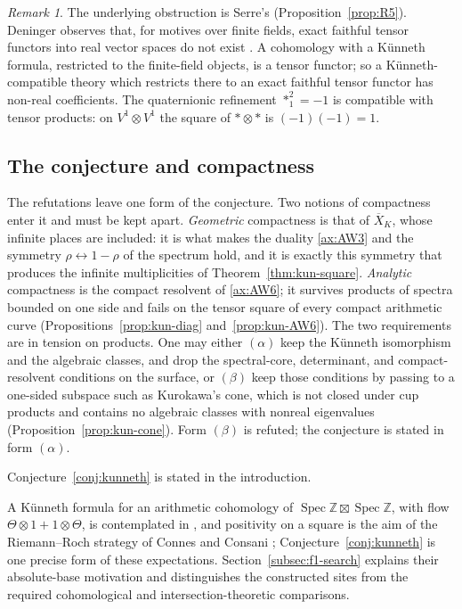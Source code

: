 \documentclass[11pt]{amsart}
\theoremstyle{plain}
\theoremstyle{definition}
\theoremstyle{remark}
\newtheorem{remark}[theorem]{Remark}
\numberwithin{equation}{section}
\newcommand{\Z}{\mathbb{Z}}
\newcommand{\Xbar}{\overline{X}}
\DeclareMathOperator{\Spec}{Spec}
\begin{document}
\begin{remark}\label{rem:kun-real}
The underlying obstruction is Serre's (Proposition~\ref{prop:R5}).
Deninger observes that, for motives over finite fields, exact faithful
tensor functors into real vector spaces do not exist
\cite[p.~184]{Deninger1998Analogies}. A cohomology with a K\"unneth
formula, restricted to the finite-field objects, is a tensor functor;
so a K\"unneth-compatible theory which restricts there to an exact
faithful tensor functor has non-real coefficients. The quaternionic
refinement $*_1^2=-1$ is compatible with tensor products: on
$V^1\otimes V^1$ the square of $*\otimes*$ is $(-1)(-1)=1$.
\end{remark}

\subsection{The conjecture and compactness}\label{subsec:kun-conj}

The refutations leave one form of the conjecture. Two notions of
compactness enter it and must be kept apart. \emph{Geometric}
compactness is that of $\Xbar_K$, whose infinite places are included:
it is what makes the duality \ref{ax:AW3} and the symmetry
$\rho\leftrightarrow1-\rho$ of the spectrum hold, and it is exactly this
symmetry that produces the infinite multiplicities of
Theorem~\ref{thm:kun-square}. \emph{Analytic} compactness is the compact
resolvent of \ref{ax:AW6}; it survives products of spectra bounded on
one side and fails on the tensor square of every compact arithmetic
curve (Propositions~\ref{prop:kun-diag} and~\ref{prop:kun-AW6}). The two
requirements are in tension on products. One may either $(\alpha)$ keep the
K\"unneth isomorphism and the algebraic classes, and drop the
spectral-core, determinant, and compact-resolvent conditions on the
surface, or $(\beta)$ keep those conditions by passing to a one-sided subspace
such as Kurokawa's cone, which is not closed under cup products and
contains no algebraic classes with nonreal eigenvalues
(Proposition~\ref{prop:kun-cone}). Form $(\beta)$ is refuted; the conjecture
is stated in form $(\alpha)$.

Conjecture~\ref{conj:kunneth} is stated in the introduction.


A K\"unneth formula for an arithmetic cohomology of
$\Spec\Z\boxtimes\Spec\Z$, with flow $\Theta\otimes1+1\otimes\Theta$,
is contemplated in \cite[(7.32), pp.~41--42]{Deninger1994Motivic}, and
positivity on a square is the aim of the Riemann--Roch strategy of
Connes and Consani \cite[\S3, pp.~16--18]{ConnesConsani2018RiemannRoch};
Conjecture~\ref{conj:kunneth} is one precise form of these
expectations. Section~\ref{subsec:f1-search} explains their absolute-base
motivation and distinguishes the constructed sites from the required
cohomological and intersection-theoretic comparisons.
\end{document}
